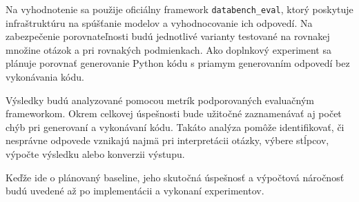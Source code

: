 Na vyhodnotenie sa použije oficiálny framework \texttt{databench\_eval}, ktorý poskytuje infraštruktúru na spúšťanie modelov a vyhodnocovanie ich odpovedí. Na zabezpečenie porovnateľnosti budú jednotlivé varianty testované na rovnakej množine otázok a pri rovnakých podmienkach. Ako doplnkový experiment sa plánuje porovnať generovanie Python kódu s priamym generovaním odpovedí bez vykonávania kódu.

Výsledky budú analyzované pomocou metrík podporovaných evaluačným frameworkom. Okrem celkovej úspešnosti bude užitočné zaznamenávať aj počet chýb pri generovaní a vykonávaní kódu. Takáto analýza pomôže identifikovať, či nesprávne odpovede vznikajú najmä pri interpretácii otázky, výbere stĺpcov, výpočte výsledku alebo konverzii výstupu.

Keďže ide o plánovaný baseline, jeho skutočná úspešnosť a výpočtová náročnosť budú uvedené až po implementácii a vykonaní experimentov.

